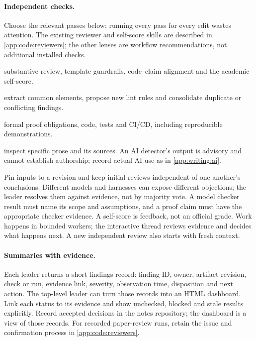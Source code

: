 \paragraph{Independent checks.} Choose the relevant passes below; running every pass for every edit wastes attention. The existing reviewer and self-score skills are described in \cref{app:code:reviewers}; the other lenses are workflow recommendations, not additional installed checks.
\begin{description}[noitemsep]
  \item[Paper:] substantive review, template guardrails, code--claim alignment and the academic self-score.
  \item[Reuse:] extract common elements, propose new lint rules and consolidate duplicate or conflicting findings.
  \item[Artifacts:] formal proof obligations, code, tests and CI/CD, including reproducible demonstrations.
  \item[AI-style concerns:] inspect specific prose and its sources. An AI detector's output is advisory and cannot establish authorship; record actual AI use as in \cref{app:writing:ai}.
\end{description}
Pin inputs to a revision and keep initial reviews independent of one another's conclusions. Different models and harnesses can expose different objections; the leader resolves them against evidence, not by majority vote. A model checker result must name its scope and assumptions, and a proof claim must have the appropriate checker evidence. A self-score is feedback, not an official grade. Work happens in bounded workers; the interactive thread reviews evidence and decides what happens next. A new independent review also starts with fresh context.

\paragraph{Summaries with evidence.} Each leader returns a short findings record: finding ID, owner, artifact revision, check or run, evidence link, severity, observation time, disposition and next action. The top-level leader can turn those records into an HTML dashboard. Link each status to its evidence and show unchecked, blocked and stale results explicitly. Record accepted decisions in the notes repository; the dashboard is a view of those records. For recorded paper-review runs, retain the issue and confirmation process in \cref{app:code:reviewers}.

